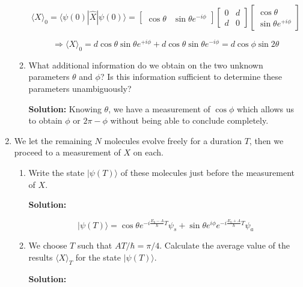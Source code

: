 \documentclass{article}
\begin{document}
\begin{enumerate}
\begin{enumerate}
{        $$
        \langle X \rangle_{0} = \langle \psi(0)| \hat{X} |\psi(0) \rangle = \begin{bmatrix}
        \cos \theta & \sin \theta e^{-i \phi}
        \end{bmatrix} \begin{bmatrix}
        0 & d \\
        d & 0
        \end{bmatrix} \begin{bmatrix}
        \cos \theta \\
        \sin \theta e^{+i \phi}
        \end{bmatrix}
        $$

        $$
        \Longrightarrow \langle X \rangle_{0} = d \cos \theta \sin \theta e^{+i \phi} + d \cos \theta \sin \theta e^{-i \phi} = d \cos \phi \sin 2 \theta
        $$}

        \item What additional information do we obtain on the two unknown parameters $\theta$ and $\phi$? Is this information sufficient to determine these parameters unambiguously?

        {\color{red}\textbf{Solution:} Knowing $\theta$, we have a measurement of $\cos \phi$ which allows us to obtain $\phi$ or $2 \pi - \phi$ without being able to conclude completely.}

    \end{enumerate}

    \item We let the remaining $N$ molecules evolve freely for a duration $T$, then we proceed to a measurement of $X$ on each.

    \begin{enumerate}
        \item Write the state $|\psi(T)\rangle$ of these molecules just before the measurement of $X$.

        {\color{red}\textbf{Solution:}

        $$
        |\psi(T)\rangle = \cos \theta e^{-i \frac{E_{0} - A}{\hbar} T} \psi_{s} + \sin \theta e^{i \phi} e^{-i \frac{E_{0} + A}{\hbar} T} \psi_{a}
        $$}

        \item We choose $T$ such that $A T / \hbar = \pi / 4$. Calculate the average value of the results $\langle X \rangle_{T}$ for the state $|\psi(T)\rangle$.

        {\color{red}\textbf{Solution:}

}
\end{enumerate}
\end{enumerate}
\end{document}
